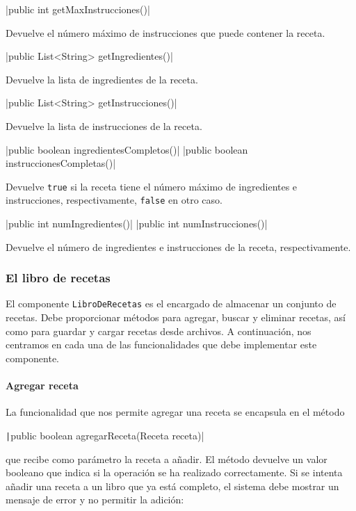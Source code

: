 \documentclass[
    a4paper, %
    12pt, %
]{CSSullivanBusinessReport}
\begin{document}
|public int getMaxInstrucciones()|

Devuelve el número máximo de instrucciones que puede contener la receta.

|public List<String> getIngredientes()|

Devuelve la lista de ingredientes de la receta.

|public List<String> getInstrucciones()|

Devuelve la lista de instrucciones de la receta.

|public boolean ingredientesCompletos()|
|public boolean instruccionesCompletas()|

Devuelve \texttt{true} si la receta tiene el número máximo de ingredientes e instrucciones, respectivamente, \texttt{false} en otro caso.

|public int numIngredientes()|
|public int numInstrucciones()|

Devuelve el número de ingredientes e instrucciones de la receta, respectivamente.



\subsubsection{El libro de recetas}\label{sec:libro-recetas}

El componente \texttt{LibroDeRecetas} es el encargado de almacenar un conjunto de recetas. Debe proporcionar métodos para agregar, buscar y eliminar recetas, así como para guardar y cargar recetas desde archivos. A continuación, nos centramos en cada una de las funcionalidades que debe implementar este componente.

\paragraph{Agregar receta}

La funcionalidad que nos permite agregar una receta se encapsula en el método

\texttt|public boolean agregarReceta(Receta receta)|

que recibe como parámetro la receta a añadir. El método devuelve un valor booleano que indica si la operación se ha realizado correctamente. Si se intenta añadir una receta a un libro que ya está completo, el sistema debe mostrar un mensaje de error y no permitir la adición:
\end{document}
